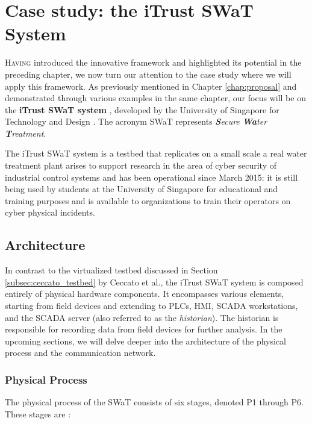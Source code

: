 \chapter{Case study: the iTrust SWaT System}
\label{casestudy}

\linenumbers
\lettrine[lines=2]{H}{aving} introduced the innovative framework and highlighted its potential in the preceding chapter, we now turn our attention to the case study where we will apply this framework. As previously mentioned in Chapter \ref{chap:proposal} and demonstrated through various examples in the same chapter, our focus will be on the \textbf{iTrust SWaT system} \cite{swat_home}, developed by the University of Singapore for Technology and Design \cite{itrust_site}. The acronym SWaT represents \textit{\textbf{S}ecure \textbf{Wa}ter \textbf{T}reatment}.

\bigskip
The iTrust SWaT system is a testbed that replicates on a small scale a real water treatment plant arises to support research in the area of cyber security of industrial control systems and has been operational since March 2015: it is still being used by students at the University of Singapore for educational and training purposes and is available to organizations to train their operators on cyber physical incidents.

\section{Architecture}
\label{sec:5_swat_architecture}
In contrast to the virtualized testbed discussed in Section \ref{subsec:ceccato_testbed} by Ceccato et al., the iTrust SWaT system is composed entirely of physical hardware components. It encompasses various elements, starting from field devices and extending to PLCs, HMI, SCADA workstations, and the SCADA server (also referred to as the \textit{historian}). The historian is responsible for recording data from field devices for further analysis. In the upcoming sections, we will delve deeper into the architecture of the physical process and the communication network.

\subsection{Physical Process} 
\label{subsec:5_swat_physical_architecture}
The physical process of the SWaT consists of six stages, denoted P1 through P6. These stages are \cite{swat_tecnical_pdf}\cite{swat_tippenhauer}:

